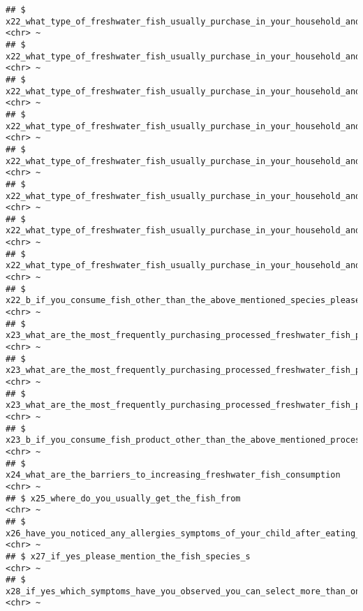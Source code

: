 \documentclass[
]{article}
\begin{document}
\begin{verbatim}
## $ x22_what_type_of_freshwater_fish_usually_purchase_in_your_household_and_how_much_per_month_pethiya                                           <chr> ~
## $ x22_what_type_of_freshwater_fish_usually_purchase_in_your_household_and_how_much_per_month_aandha                                            <chr> ~
## $ x22_what_type_of_freshwater_fish_usually_purchase_in_your_household_and_how_much_per_month_kawayya                                           <chr> ~
## $ x22_what_type_of_freshwater_fish_usually_purchase_in_your_household_and_how_much_per_month_ankutta                                           <chr> ~
## $ x22_what_type_of_freshwater_fish_usually_purchase_in_your_household_and_how_much_per_month_magura                                            <chr> ~
## $ x22_what_type_of_freshwater_fish_usually_purchase_in_your_household_and_how_much_per_month_karadu_issa                                       <chr> ~
## $ x22_what_type_of_freshwater_fish_usually_purchase_in_your_household_and_how_much_per_month_carp_spp                                          <chr> ~
## $ x22_what_type_of_freshwater_fish_usually_purchase_in_your_household_and_how_much_per_month_other                                             <chr> ~
## $ x22_b_if_you_consume_fish_other_than_the_above_mentioned_species_please_mention_it_here                                                      <chr> ~
## $ x23_what_are_the_most_frequently_purchasing_processed_freshwater_fish_products_in_your_household_per_month_dried_fish                        <chr> ~
## $ x23_what_are_the_most_frequently_purchasing_processed_freshwater_fish_products_in_your_household_per_month_smoked_fish                       <chr> ~
## $ x23_what_are_the_most_frequently_purchasing_processed_freshwater_fish_products_in_your_household_per_month_other                             <chr> ~
## $ x23_b_if_you_consume_fish_product_other_than_the_above_mentioned_processed_product_please_mention_it_here                                    <chr> ~
## $ x24_what_are_the_barriers_to_increasing_freshwater_fish_consumption                                                                          <chr> ~
## $ x25_where_do_you_usually_get_the_fish_from                                                                                                   <chr> ~
## $ x26_have_you_noticed_any_allergies_symptoms_of_your_child_after_eating_freshwater_fish                                                       <chr> ~
## $ x27_if_yes_please_mention_the_fish_species_s                                                                                                 <chr> ~
## $ x28_if_yes_which_symptoms_have_you_observed_you_can_select_more_than_one_option                                                              <chr> ~
\end{verbatim}
\end{document}

